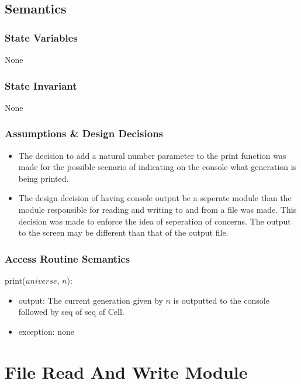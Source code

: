 \documentclass[12pt]{article}
\begin{document}
\subsection* {Semantics}

\subsubsection* {State Variables}

None

\subsubsection* {State Invariant}

None

\subsubsection* {Assumptions \& Design Decisions}

\begin{itemize}
\item The decision to add a natural number parameter to the print function was 
  made for the possible scenario of indicating on the console what generation
  is being printed.
\item The design decision of having console output be a seperate module than
  the module responsible for reading and writing to and from a file was made.
  This decision was made to enforce the idea of seperation of concerns. The
  output to the screen may be different than that of the output file.
\end{itemize}

\subsubsection* {Access Routine Semantics}

print($universe$, $n$):
\begin{itemize}
\item output: The current generation given by $n$ is outputted to the console
followed by seq of seq of Cell.
\item exception: none
\end{itemize}

\newpage

\section* {File Read And Write Module}
\end{document}
